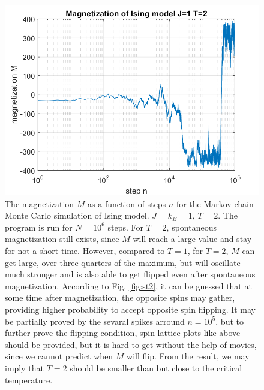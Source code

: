\documentclass[12pt, graphicx]{article}
\begin{document}
\begin{figure}[ht]
\centering
\includegraphics[width = 120mm]{mt2.png}
\caption{The magnetization $M$ as a function of steps $n$ for the Markov chain Monte Carlo simulation of Ising model. $J=k_B=1$, $T=2$. The program is run for $N=10^6$ steps. For $T=2$, spontaneous magnetization still exists, since $M$ will reach a large value and stay for not a short time. However, compared to $T=1$, for $T=2$, $M$ can get large, over three quarters of the maximum, but will oscillate much stronger and is also able to get flipped even after spontaneous magnetization. According to Fig. \ref{fig:st2}, it can be guessed that at some time after magnetization, the opposite spins may gather, providing higher probability to accept opposite spin flipping. It may be partially proved by the sevaral spikes arround $n=10^5$, but to further prove the flipping condition, spin lattice plots like above should be provided, but it is hard to get without the help of movies, since we cannot predict when $M$ will flip. From the result, we may imply that $T=2$ should be smaller than but close to the critical temperature.}
\label{fig:mt2}
\end{figure}
\end{document}

